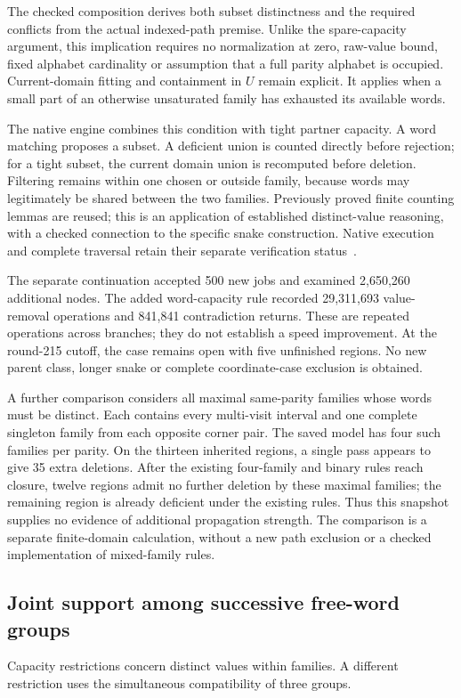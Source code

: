 \documentclass[11pt,a4paper]{article}
\theoremstyle{definition}
\theoremstyle{remark}
\begin{document}
The checked composition derives both subset distinctness and the required
conflicts from the actual indexed-path premise. Unlike the spare-capacity
argument, this implication requires no normalization at zero, raw-value
bound, fixed alphabet cardinality or assumption that a full parity
alphabet is occupied. Current-domain fitting and containment in $U$
remain explicit. It applies when a small part of an otherwise
unsaturated family has exhausted its available words.

The native engine combines this condition with tight partner capacity.
A word matching proposes a subset. A deficient union is counted
directly before rejection; for a tight subset, the current domain
union is recomputed before deletion. Filtering remains within one
chosen or outside family, because words may legitimately be shared
between the two families. Previously proved finite counting lemmas
are reused; this is an application of established distinct-value
reasoning, with a checked connection to the specific snake construction.
Native execution and complete traversal retain their separate
verification status~\cite{research215}.

The separate continuation accepted 500 new jobs and examined 2,650,260 additional nodes. The added word-capacity rule recorded 29,311,693 value-removal operations and 841,841 contradiction returns. These are repeated operations across branches; they do not establish a speed improvement.
At the round-215 cutoff, the case remains open with five unfinished regions. No new parent class, longer snake or complete coordinate-case exclusion is obtained.

A further comparison considers all maximal same-parity families whose
words must be distinct. Each contains every multi-visit interval and
one complete singleton family from each opposite corner pair. The saved
model has four such families per parity. On the thirteen inherited
regions, a single pass appears to give 35 extra deletions. After the
existing four-family and binary rules reach closure, twelve regions
admit no further deletion by these maximal families; the remaining
region is already deficient under the existing rules. Thus this
snapshot supplies no evidence of additional propagation strength.
The comparison is a separate finite-domain calculation, without a
new path exclusion or a checked implementation of mixed-family rules.


\subsection{Joint support among successive free-word groups}
\label{sec:joint216}
Capacity restrictions concern distinct values within families. A different
restriction uses the simultaneous compatibility of three groups.
\end{document}
